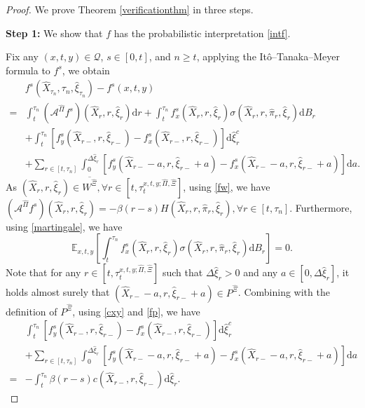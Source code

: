\documentclass[11pt,reqno]{article}%
\numberwithin{equation}{section}
\begin{document}
\begin{proof}
We prove Theorem \ref{verificationthm} in three steps.

{\bf Step 1:} We show that $f$ has the probabilistic interpretation \eqref{intf}.

Fix any $(x,t,y)\in\mathcal{Q}$, $s\in[0,t]$, and $n\ge t$, applying the It\^{o}--Tanaka--Meyer formula to $f^{s}$, we obtain
\begin{equation}
\begin{aligned}
&f^{s}\left(\hat{X}_{\tau_{n}},\tau_{n},\hat{\xi}_{\tau_{n}}\right)-f^{s}(x,t,y)\\=&\int_{t}^{\tau_{n}}\left(\mathcal{A}^{\hat{\Pi}}f^{s}\right)\left(\hat{X}_{r},r,\hat{\xi}_{r}\right)\mathrm{d}r+\int_{t}^{\tau_{n}}f^{s}_{x}\left(\hat{X}_{r},r,\hat{\xi}_{r}\right)\sigma\left(\hat{X}_{r},r,\hat\pi_r,\hat{\xi}_{r}\right)\mathrm{d}B_{r}\\
&+\int_{t}^{\tau_{n}}\left[f^{s}_{y}\left(\hat{X}_{r-},r,\hat{\xi}_{r-}\right)-f^{s}_{x}\left(\hat{X}_{r-},r,\hat{\xi}_{r-}\right)\right]\mathrm{d}\hat{\xi}_{r}^{c}\\
&+\sum\limits_{r\in[t,\tau_{n}]}\int_{0}^{\Delta\hat{\xi}_{r}}\left[f^{s}_{y}\left(\hat{X}_{r-}-a,r,\hat{\xi}_{r-}+a\right)-f^{s}_{x}\left(\hat{X}_{r-}-a,r,\hat{\xi}_{r-}+a\right)\right]\mathrm{d}a.
\end{aligned}
\label{fsito}\end{equation}
As $\left(\hat{X}_{r},r,\hat{\xi}_{r}\right)\in\overline{W^{\hat{\Xi}}}, \forall r\in[t,\tau^{x,t,y;\hat{\Pi},\hat{\Xi}}_{t}]$, using \eqref{fw}, we have $\left(\mathcal{A}^{\hat{\Pi}}f^{s}\right)\left(\hat{X}_{r},r,\hat{\xi}_{r}\right)=-\beta(r-s)H\left(\hat{X}_{r},r,\hat\pi_r,\hat{\xi}_{r}\right),  \forall r\in[t,\tau_n]$. Furthermore, using \eqref{martingale}, we have 
\begin{equation}
\mathbb{E}_{x,t,y}\left[\int_{t}^{\tau_{n}}f^{s}_{x}\left(\hat{X}_{r},r,\hat{\xi}_{r}\right)\sigma\left(\hat{X}_{r},r,\hat\pi_r,\hat{\xi}_{r}\right)\mathrm{d}B_{r}\right]=0.
\nonumber\end{equation}
Note that for any $r\in[t,\tau^{x,t,y;\hat{\Pi},\hat{\Xi}}_{t}]$ such that $\Delta\hat{\xi}_{r}>0$ and any $a\in[0,\Delta\hat{\xi}_{r}]$, it holds almost surely that $(\hat{X}_{r-}-a,r,\hat{\xi}_{r-}+a)\in P^{\hat{\Xi}}$. Combining with the definition of $P^{\hat{\Xi}}$, using \eqref{cxy} and \eqref{fp}, we have 
\begin{equation}\begin{aligned}
&\int_{t}^{\tau_{n}}\left[f^{s}_{y}\left(\hat{X}_{r-},r,\hat{\xi}_{r-}\right)-f^{s}_{x}\left(\hat{X}_{r-},r,\hat{\xi}_{r-}\right)\right]\mathrm{d}\hat{\xi}_{r}^{c}\\
&+\sum\limits_{r\in[t,\tau_{n}]}\int_{0}^{\Delta\hat{\xi}_{r}}\left[f^{s}_{y}\left(\hat{X}_{r-}-a,r,\hat{\xi}_{r-}+a\right)-f^{s}_{x}\left(\hat{X}_{r-}-a,r,\hat{\xi}_{r-}+a\right)\right]\mathrm{d}a\\=&
-\int_{t}^{\tau_{n}}\beta(r-s)c\left(\hat{X}_{r-},r,\hat{\xi}_{r-}\right)\mathrm{d}\hat{\xi}_{r}.
\end{aligned}\nonumber\end{equation}


\end{proof}
\end{document}
